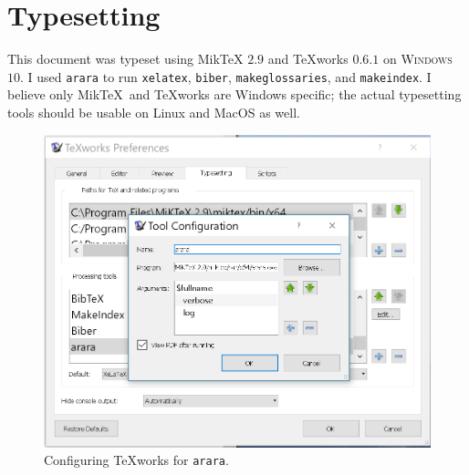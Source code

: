 \section{Typesetting}

This document was typeset using Mik\TeX{} $2.9$ \cite{Miktex2017} 
and {\TeX}works $0.6.1$ \cite{Texworks2017} 
on \textsc{Windows} $10$. 
I used \texttt{arara} \cite{arara2017} 
to run \texttt{xelatex}, \texttt{biber}, \texttt{makeglossaries},  and
\texttt{makeindex}.
I believe only Mik\TeX\  and {\TeX}works are Windows specific; 
the actual typesetting tools should be usable on Linux and MacOS as well.

\begin{figure}[htbp]
\centering
\includegraphics[scale=0.5]{fig/arara.png}
\caption{Configuring {\TeX}works for \texttt{arara}.}
\label{fig:arara}
\end{figure}
